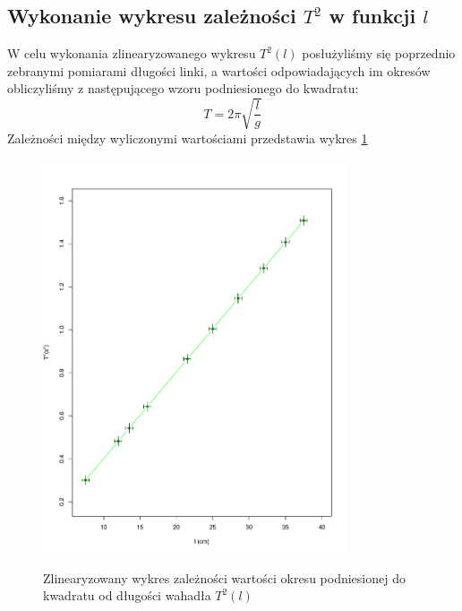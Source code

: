 \documentclass{fizraport}
\begin{document}
\subsection{Wykonanie wykresu zależności $T^2$ w funkcji $l$}
W celu wykonania zlinearyzowanego wykresu  $T^2(l)$ posłużyliśmy się poprzednio zebranymi pomiarami długości linki, a wartości odpowiadających im okresów obliczyliśmy z następującego wzoru podniesionego do kwadratu:
%
\[ T = 2\pi \sqrt{\frac{l}{g}} \]
%
Zależności między wyliczonymi wartościami przedstawia wykres \figurename{\ref{fig:w3}}
\begin{figure}[htbp]
 \centering
  \caption{Zlinearyzowany wykres zależności wartości okresu podniesionej do kwadratu od długości wahadła $T^2(l)$}
 \includegraphics[width=0.8\textwidth,keepaspectratio=true]{wykres2.pdf}
 \label{fig:w3}
\end{figure}
\pagebreak
\end{document}
